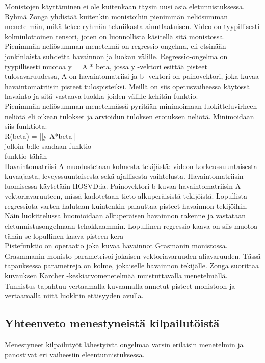 Monistojen käyttäminen ei ole kuitenkaan täysin uusi asia eletunnistuksessa.
Ryhmä Zonga yhdistää kuitenkin monistoihin pienimmän neliösumman menetelmän, mikä tekee ryhmän tekniikasta ainutlaatuisen. 
Video on tyypillisesti kolmiulottoinen tensori, joten on luonnollista käsitellä sitä monistossa.
Pienimmän neliösumman menetelmä on regressio-ongelma, eli etsinään jonkinlaista suhdetta havainnon ja luokan välille.
Regressio-ongelma on tyypillisesti muotoa y = A * beta, jossa y -vektori esittää pisteet tulosavaruudessa, A on havaintomatriisi 
ja b -vektori on painovektori, joka kuvaa havaintomatriisin pisteet tulospisteiksi.
Meillä on siis opetusvaiheessa käytössä havainto ja sitä vastaava luokka joiden välille kehitän funktio.\\

Pienimmän neliösumman menetelmässä pyritään minimoimaan luokitteluvirheen neliötä eli oikean tulokset ja arvioidun tuloksen erotuksen neliötä.
Minimoidaan siis funktiota: \\
R(beta) = ||y-A*beta|| \\
jolloin b:lle saadaan funktio\\
funktio tähän\\

Havaintomatriisi A muodostetaan kolmesta tekijästä: videon korkeussuuntaisesta kuvaajasta, leveyssuuntaisesta sekä ajallisesta vaihtelusta.
Havaintomatriisin luomisessa käytetään HOSVD:ia. Painovektori b kuvaa havaintomatriisin A vektoriavaruuteen, missä kadotetaan tieto alkuperäisistä tekijöistä. 
Lopullista regressiota varten halutaan kuintenkin palauttaa pisteet havainnon tekijöihin.
Näin luokittelussa huomioidaan alkuperäisen havainnon rakenne ja vastataan eletunnistusongelmaan tehokkaammin. 
Lopullinen regressio kaava on siis muotoa\\
tähän se lopullinen kaava pisteen kera\\
Pistefunktio on operaatio joka kuvaa havainnot Grasmanin monistossa. Grasmmanin monisto parametrisoi jokaisen vektoriavaruuden aliavaruuden.
Tässä tapauksessa parametreja on kolme, jokaiselle havainnon tekijälle.
Zonga suorittaa kuvauksen Karcher -keskiarvomenetelmää muistuttavalla menetelmällä.\\

Tunnistus tapahtuu vertaamalla kuvaamalla annetut pisteet monistoon ja vertaamalla niitä luokkiin etäisyyden avulla. \citep {6239180}\\


\subsection{Yhteenveto menestyneistä kilpailutöistä}
Menestyneet kilpailutyöt lähestyivät ongelmaa varsin erilaisin menetelmin ja panostivat eri vaiheesiin eleentunnistuksessa.
 
